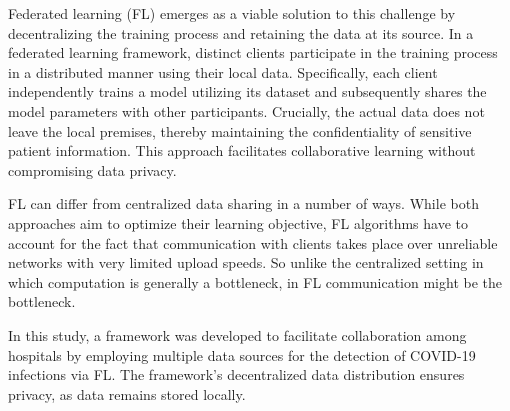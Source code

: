 Federated learning (FL) emerges as a viable solution to this challenge by decentralizing the training process and retaining the data at its source. In a federated learning framework, distinct clients participate in the training process in a distributed manner using their local data. Specifically, each client independently trains a model utilizing its dataset and subsequently shares the model parameters with other participants. Crucially, the actual data does not leave the local premises, thereby maintaining the confidentiality of sensitive patient information. This approach facilitates collaborative learning without compromising data privacy.

FL can differ from centralized data sharing in a number of ways. While both approaches aim to optimize their learning objective, FL algorithms have to account for the fact that communication with clients takes place over unreliable networks with very limited upload speeds. So unlike 
the centralized setting in which computation is generally a bottleneck, in FL communication might be the bottleneck. 

In this study, a framework was developed to facilitate collaboration among hospitals by employing multiple data sources for the detection of COVID-19 infections via FL. The framework's decentralized data distribution ensures privacy, as data remains stored locally\cite{darzidehkalanifederatedII}.





 





